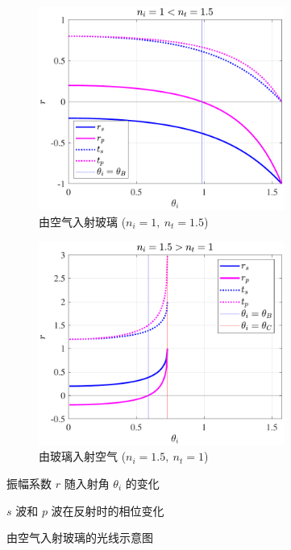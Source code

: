 \documentclass[UTF8]{report}
\theoremstyle{MyLineTheoremStyle} %
\theoremstyle{MyBlockTheoremStyle} %
\theoremstyle{MySubsubsectionStyle} %
\begin{document}
\begin{figure}[H]\centering
\begin{subfigure}[t]{0.49\textwidth}\centering
    \includegraphics[height=190pt]{assets/1,2/2024-09-15_10-53-31.pdf}
    \caption{ 由空气入射玻璃 ($n_i = 1,\ n_t = 1.5$) }
\end{subfigure}
\begin{subfigure}[t]{0.49\textwidth}\centering
    \includegraphics[height=190pt]{assets/1,2/2024-09-15_10-53-27.pdf}
    \caption{ 由玻璃入射空气 ($n_i = 1.5,\ n_t = 1$) }
\end{subfigure}
\caption{ 振幅系数 $r$ 随入射角 $\theta_i$ 的变化 }\label{振幅系数随入射角的变化}
\end{figure}

\begin{figure}[ht]\centering
    
    \caption{ $s$ 波和 $p$ 波在反射时的相位变化}\label{反射时 s 波和 p 波的相位变化}
\end{figure}

\begin{figure}[H]\centering

\caption{ 由空气入射玻璃的光线示意图}\label{反射示意图}
\end{figure}
\end{document}
